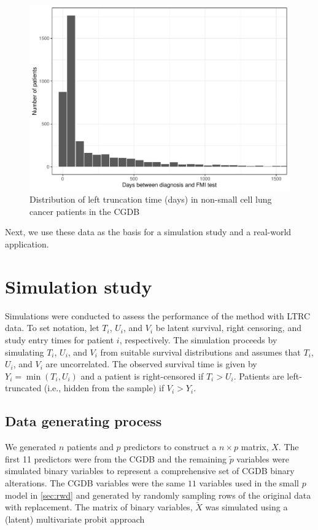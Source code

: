 \documentclass[11pt,final,fleqn]{article}\usepackage[]{graphicx}\usepackage[]{color}
\theoremstyle{plain}
\begin{document}
\begin{figure}[h]
 \centering
\includegraphics[max size={\textwidth}]{figs/left_trunc_hist.pdf} 
\caption{Distribution of left truncation time (days) in non-small cell lung cancer patients in the CGDB}
 \label{fig:left-trunc-time}
\end{figure}

Next, we use these data as the basis for a simulation study and a real-world application.

\section{Simulation study} \label{sec:simulation}
Simulations were conducted to assess the performance of the method with LTRC data. To set notation, let $T_i$, $U_i$, and $V_i$ be latent survival, right censoring, and study entry times for patient $i$, respectively. The simulation proceeds by simulating $T_i$, $U_i$, and $V_i$ from suitable survival distributions and assumes that $T_i$, $U_i$, and $V_i$ are uncorrelated. The observed survival time is given by $Y_i = \min(T_i, U_i)$ and a patient is right-censored if $T_i > U_i$. Patients are left-truncated (i.e., hidden from the sample) if $V_i > Y_i$. 

\subsection{Data generating process}
We generated $n$ patients and $p$ predictors to construct a $n \times p$ matrix, $X$. The first 11 predictors were from the CGDB and the remaining $\tilde{p}$ variables were simulated binary variables to represent a comprehensive set of CGDB binary alterations. The CGDB variables were the same $11$ variables used in the small $p$ model in \autoref{sec:rwd} and generated by randomly sampling rows of the original data with replacement. The matrix of binary variables, $\tilde{X}$ was simulated using a (latent) multivariate probit approach
\end{document}
